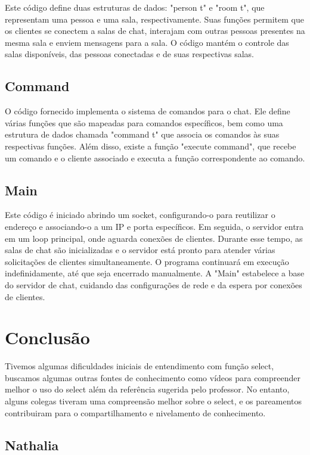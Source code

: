 \documentclass[a4paper]{article}
\begin{document}
Este código define duas estruturas de dados: "person t" e "room t", que representam uma pessoa e uma sala, respectivamente. Suas funções permitem que os clientes se conectem a salas de chat, interajam com outras pessoas presentes na mesma sala e enviem mensagens para a sala. O código mantém o controle das salas disponíveis, das pessoas conectadas e de suas respectivas salas.

\subsection{Command}

O código fornecido implementa o sistema de comandos para o chat. Ele define várias funções que são mapeadas para comandos específicos, bem como uma estrutura de dados chamada "command t" que associa os comandos às suas respectivas funções. Além disso, existe a função "execute command", que recebe um comando e o cliente associado e executa a função correspondente ao comando.

\subsection{Main}

Este código é iniciado abrindo um socket, configurando-o para reutilizar o endereço e associando-o a um IP e porta específicos. Em seguida, o servidor entra em um loop principal, onde aguarda conexões de clientes. Durante esse tempo, as salas de chat são inicializadas e o servidor está pronto para atender várias solicitações de clientes simultaneamente. O programa continuará em execução indefinidamente, até que seja encerrado manualmente. A "Main" estabelece a base do servidor de chat, cuidando das configurações de rede e da espera por conexões de clientes.

\section{Conclusão}

Tivemos algumas dificuldades iniciais de entendimento com função select, buscamos algumas outras fontes de conhecimento como vídeos para compreender melhor o uso do select além da referência sugerida pelo professor. No entanto, alguns colegas tiveram uma compreensão melhor sobre o select, e os pareamentos contribuiram para o compartilhamento e nivelamento de conhecimento.

\subsection{Nathalia}
\end{document}
